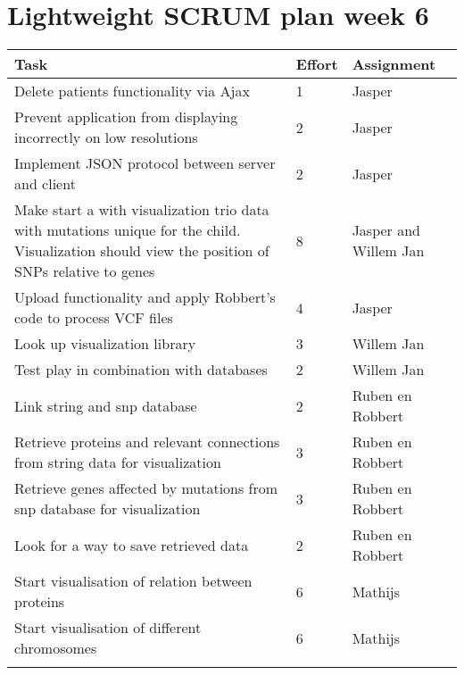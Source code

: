 \documentclass[a4paper]{report}
\begin{document}


\section*{Lightweight SCRUM plan week 6}

\setlength\extrarowheight{5pt}
\begin{table}[ht]
\begin{tabular}{p{8cm}|p{2cm}|p{3cm}}

\textbf{Task} & \textbf{Effort} & \textbf{Assignment}\\
\hline \hline

Delete patients functionality via Ajax & 1 & Jasper\\
Prevent application from displaying incorrectly on low resolutions & 2 & Jasper\\
Implement JSON protocol between server and client & 2 & Jasper\\
Make start a with visualization trio data with mutations unique for the child. Visualization should view the position of SNPs relative to genes & 8 & Jasper and Willem Jan\\
Upload functionality and apply Robbert's code to process VCF files & 4 & Jasper\\
Look up visualization library & 3 & Willem Jan\\
Test play in combination with databases & 2 & Willem Jan\\
Link string and snp database & 2 & Ruben en Robbert\\
Retrieve proteins and relevant connections from string data for visualization & 3 & Ruben en Robbert\\
Retrieve genes affected by mutations from snp database for visualization & 3 & Ruben en Robbert\\
Look for a way to save retrieved data & 2 & Ruben en Robbert\\
Start visualisation of relation between proteins & 6 & Mathijs \\
Start visualisation of different chromosomes & 6 & Mathijs \\

\vspace{10pt} & \vspace{10pt} & \vspace{10pt}\\

\end{tabular}
\end{table}
\end{document}
